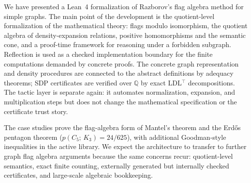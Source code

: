 \documentclass{article}
\newcommand{\tdensity}[2]{p(#1;\,#2)}
\begin{document}
We have presented a Lean~4 formalization of Razborov's flag algebra method for
simple graphs.  The main point of the development is the quotient-level
formalization of the mathematical theory: flags modulo isomorphism, the
quotient algebra of density-expansion relations, positive homomorphisms and the
semantic cone, and a proof-time framework for reasoning under a forbidden
subgraph.  Reflection is used as a checked implementation boundary for the
finite computations demanded by concrete proofs.  The concrete graph
representation and density procedures are connected to the abstract
definitions by adequacy theorems; SDP certificates are verified over
$\mathbb{Q}$ by exact LDL$^\top$ decompositions.  The tactic layer is separate
again: it automates normalization, expansion, and multiplication steps but does
not change the mathematical specification or the certificate trust story.

The case studies prove the flag-algebra form of Mantel's theorem and the
Erd\H{o}s pentagon theorem ($\tdensity{C_5}{K_3} = 24/625$), with additional
Goodman-style inequalities in the active library.  We expect the architecture
to transfer to further graph flag algebra arguments because the same concerns
recur: quotient-level semantics, exact finite counting, externally generated
but internally checked certificates, and large-scale algebraic bookkeeping.
\end{document}
